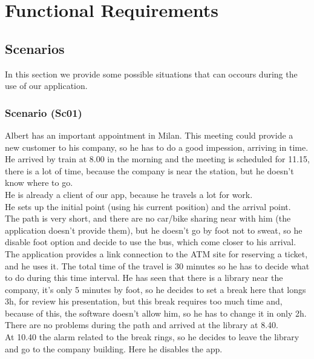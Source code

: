 \documentclass[a4paper,leqno]{book}
\begin{document}
\section{Functional Requirements}

\subsection{Scenarios}
In this section we provide some possible situations that can occours during the use of our application.

\subsubsection{Scenario (Sc01) }
Albert has an important appointment in Milan. 
This meeting could provide a new customer to his company, so he has to do a good impession, arriving in time.\\
He arrived by train at 8.00 in the morning and the meeting is scheduled for 11.15, there is a lot of time, because 
the company is near the station, but he doesn't know where to go.\\
He is already a client of our app, because he travels a lot for work.\\
He sets up the initial point (using his current position) and the arrival point.\\
The path is very short, and there are no car/bike sharing near with him (the application doesn't provide them), but he doesn't go by foot not to sweat,
so he disable foot option and decide to use the bus, which come closer to his arrival.\\
The application provides a link connection to the ATM site for reserving a ticket, and he uses it.
The total time of the travel is 30 minutes so he has to decide what to do during this time interval.
He has seen that there is a library near the company, it's only 5 minutes by foot, so he decides to set a break here that longs 3h, for review his presentation,
but this break requires too much time and, because of this, the software doesn't allow him, so he has to change it in only 2h.
There are no problems during the path and arrived at the library at 8.40.\\
At 10.40 the alarm related to the break rings, so he decides to leave the library and go to the company building. 
Here he disables the app.
\end{document}
